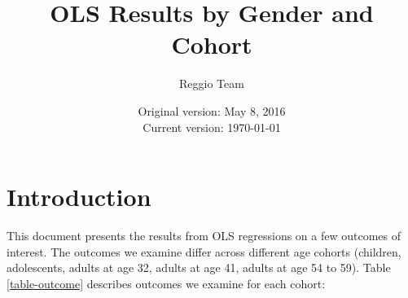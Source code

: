 

\newcommand{\labCS}{Child SDQ Score}
\newcommand{\labS}{SDQ Score}
\newcommand{\labCH}{Child Health Perception}
\newcommand{\labH}{Health Perception}
\newcommand{\labD}{Depression Score}
\newcommand{\labM}{Migration Taste}
\newcommand{\labLS}{Likes School}
\newcommand{\labLM}{Likes Math}
\newcommand{\labLL}{Likes Literature}
\newcommand{\labDS}{Difficulties to Sit Still}
\newcommand{\labDO}{Difficulties to Obey}
\newcommand{\labDI}{Lack of Excitement to Learn}
\newcommand{\labDE}{Fussy Eater}
\newcommand{\labDIFF}{Difficulties in School}



\title{OLS Results by Gender and Cohort}
\author{Reggio Team}
\date{Original version: May 8, 2016 \\ Current version: \today}
\maketitle

\doublespacing
\section{Introduction}

This document presents the results from OLS regressions on a few outcomes of interest. The outcomes we examine differ across different age cohorts (children, adolescents, adults at age 32, adults at age 41, adults at age 54 to 59). Table \ref{table-outcome} describes outcomes we examine for each cohort:

